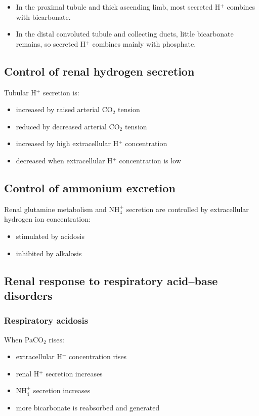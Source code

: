 \documentclass[11pt,a4paper]{article}
\begin{document}
\begin{itemize}
    \item In the proximal tubule and thick ascending limb, most secreted H$^+$ combines with bicarbonate.
    \item In the distal convoluted tubule and collecting ducts, little bicarbonate remains, so secreted H$^+$ combines mainly with phosphate.
\end{itemize}

\subsection{Control of renal hydrogen secretion}

Tubular H$^+$ secretion is:
\begin{itemize}
    \item increased by raised arterial CO$_2$ tension
    \item reduced by decreased arterial CO$_2$ tension
    \item increased by high extracellular H$^+$ concentration
    \item decreased when extracellular H$^+$ concentration is low
\end{itemize}

\subsection{Control of ammonium excretion}

Renal glutamine metabolism and NH$_4^+$ secretion are controlled by extracellular hydrogen ion concentration:
\begin{itemize}
    \item stimulated by acidosis
    \item inhibited by alkalosis
\end{itemize}

\subsection{Renal response to respiratory acid--base disorders}

\subsubsection{Respiratory acidosis}

When PaCO$_2$ rises:
\begin{itemize}
    \item extracellular H$^+$ concentration rises
    \item renal H$^+$ secretion increases
    \item NH$_4^+$ secretion increases
    \item more bicarbonate is reabsorbed and generated
\end{itemize}
\end{document}
